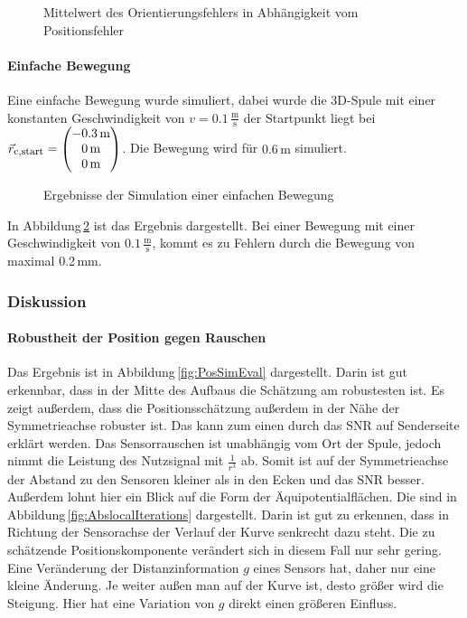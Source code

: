 \begin{figure}[h]
  \centering
  \caption{Mittelwert des Orientierungsfehlers in Abhängigkeit vom Positionsfehler}
  \label{fig:stdAbwOrPosVar}
\end{figure}

\paragraph{Einfache Bewegung}

Eine einfache Bewegung wurde simuliert, dabei wurde die 3D-Spule mit einer konstanten Geschwindigkeit von $v = 0.1\,\frac{\text{m}}{\text{s}}$ der Startpunkt liegt bei $\vec{r}_{\textrm{\footnotesize{c,start}}} = \begin{pmatrix}
  -0.3\,\text{m} \\
  0\,\text{m} \\
  0\,\text{m}
\end{pmatrix}$. Die Bewegung wird für $0.6\,\text{m}$ simuliert. 
\begin{figure}[h]
  \centering
  \caption{Ergebnisse der Simulation einer einfachen Bewegung}
  \label{fig:AbsMovement}
\end{figure}
In Abbildung\,\ref{fig:AbsMovement} ist das Ergebnis dargestellt. Bei einer Bewegung mit einer Geschwindigkeit von $0.1\,\frac{\text{m}}{\text{s}}$, kommt es zu Fehlern durch die Bewegung von maximal 0.2\,mm.

\subsubsection{Diskussion}
\paragraph{Robustheit der Position gegen Rauschen}
Das Ergebnis ist in Abbildung\,\ref{fig:PosSimEval} dargestellt. Darin ist gut erkennbar, dass in der Mitte des Aufbaus die Schätzung am robustesten ist. Es zeigt außerdem, dass die Positionsschätzung außerdem in der Nähe der Symmetrieachse robuster ist. Das kann zum einen durch das SNR auf Senderseite erklärt werden. Das Sensorrauschen ist unabhängig vom Ort der Spule, jedoch nimmt die Leistung des Nutzsignal mit $\frac{1}{r^3}$ ab. Somit ist auf der Symmetrieachse der Abstand zu den Sensoren kleiner als in den Ecken und das SNR besser. Außerdem lohnt hier ein Blick auf die Form der Äquipotentialflächen. Die sind in Abbildung\,\ref{fig:AbslocalIterations} dargestellt. Darin ist gut zu erkennen, dass in Richtung der Sensorachse der Verlauf der Kurve senkrecht dazu steht. Die zu schätzende Positionskomponente verändert sich in diesem Fall nur sehr gering. Eine Veränderung der Distanzinformation $g$ eines Sensors hat, daher nur eine kleine Änderung. Je weiter außen man auf der Kurve ist, desto größer wird die Steigung. Hier hat eine Variation von $g$ direkt einen größeren Einfluss.

